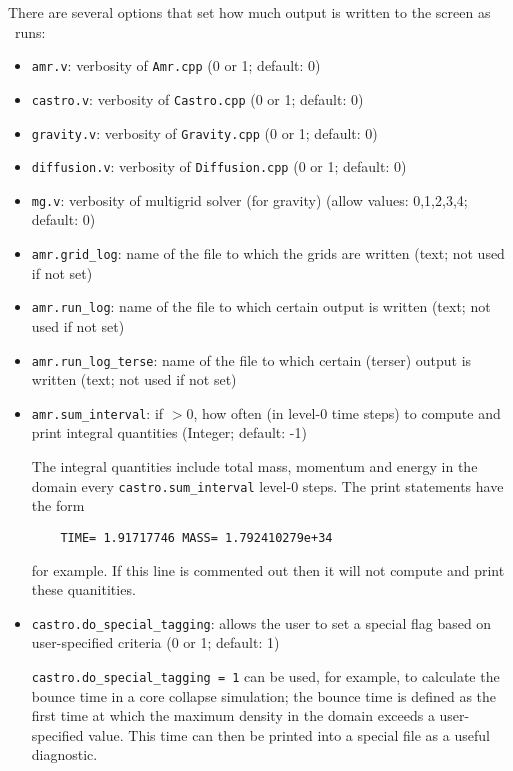 There are several options that set how much output is written to the
screen as \castro\ runs:
\begin{itemize}
\item {\tt amr.v}: verbosity of {\tt Amr.cpp} (0 or 1; default: 0)

\item {\tt castro.v}: verbosity of {\tt Castro.cpp} (0 or 1; default: 0)

\item {\tt gravity.v}: verbosity of {\tt Gravity.cpp} (0 or 1; default: 0)
  
\item {\tt diffusion.v}: verbosity of {\tt Diffusion.cpp} (0 or 1;
  default: 0)
  
\item {\tt mg.v}: verbosity of multigrid solver (for gravity) (allow
  values: 0,1,2,3,4; default: 0)
  
\item {\tt amr.grid\_log}: name of the file to which the grids are
  written (text; not used if not set)
  
\item {\tt amr.run\_log}: name of the file to which certain output is
  written (text; not used if not set)
  
\item {\tt amr.run\_log\_terse}: name of the file to which certain
  (terser) output is written (text; not used if not set)
  
\item {\tt amr.sum\_interval}: if $> 0$, how often (in level-0 time
  steps) to compute and print integral quantities (Integer; default: -1)

  The integral quantities include total mass, momentum and energy in
  the domain every {\tt castro.sum\_interval} level-0 steps.
  The print statements have the form
  \begin{verbatim}
    TIME= 1.91717746 MASS= 1.792410279e+34
  \end{verbatim}
  for example.  If this line is commented out then
  it will not compute and print these quanitities.

  
\item {\tt castro.do\_special\_tagging}: allows the user to set a
  special flag based on user-specified criteria (0 or 1; default: 1)

  {\tt castro.do\_special\_tagging = 1} can be used, for example, to
  calculate the bounce time in a core collapse simulation; the bounce
  time is defined as the first time at which the maximum density in
  the domain exceeds a user-specified value.  This time can then be
  printed into a special file as a useful diagnostic.
\end{itemize}

